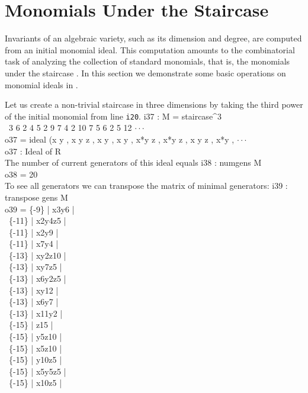 \section{Monomials Under the Staircase}

Invariants of an algebraic variety, such as its dimension
and degree, are computed from an initial monomial ideal.
This computation amounts to the combinatorial task
of analyzing the collection of standard monomials,
that is, the monomials under the staircase \cite[Chapter 9]{CLO1}.
In this section we demonstrate some basic operations on
monomial ideals in \Mtwo.

Let us create a non-trivial staircase in three dimensions
by taking the third power of the initial monomial from line {\tt i20}.
\beginOutput
i37 : M = staircase^3\\
\emptyLine
\              3 6   2 4 5   2 9   7 4     2 10     7 5   6 2 5     12  $\cdot\cdot\cdot$\\
o37 = ideal (x y , x y z , x y , x y , x*y z  , x*y z , x y z , x*y  , $\cdot\cdot\cdot$\\
\emptyLine
o37 : Ideal of R\\
\endOutput
The number of current generators of this ideal equals
\beginOutput
i38 : numgens M\\
\emptyLine
o38 = 20\\
\endOutput
To see all generators we can transpose the matrix of minimal generators:
\beginOutput
i39 : transpose gens M\\
\emptyLine
o39 = \{-9\}  | x3y6   |\\
\      \{-11\} | x2y4z5 |\\
\      \{-11\} | x2y9   |\\
\      \{-11\} | x7y4   |\\
\      \{-13\} | xy2z10 |\\
\      \{-13\} | xy7z5  |\\
\      \{-13\} | x6y2z5 |\\
\      \{-13\} | xy12   |\\
\      \{-13\} | x6y7   |\\
\      \{-13\} | x11y2  |\\
\      \{-15\} | z15    |\\
\      \{-15\} | y5z10  |\\
\      \{-15\} | x5z10  |\\
\      \{-15\} | y10z5  |\\
\      \{-15\} | x5y5z5 |\\
\      \{-15\} | x10z5  |\\
